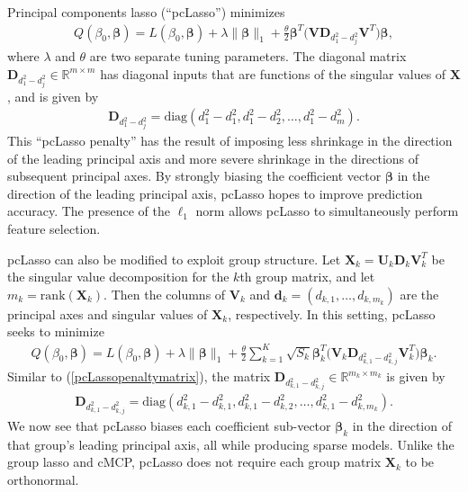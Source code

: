 \documentclass[11pt]{article}
\begin{document}
Principal components lasso (``pcLasso'') \cite{2018arXiv181004651T} minimizes 
\begin{align}
    \label{pcLasso}
    Q(\beta_0, \bm{\beta}) = L(\beta_0, \bm{\beta}) + \lambda \| \bm{\beta} \|_1 + \frac{\theta}{2} \bm{\beta}^T \Big( \mathbf{V} \mathbf{D}_{d_1^2 - d_j^2} \mathbf{V}^T \Big) \bm{\beta},
\end{align}
where $\lambda$ and $\theta$ are two separate tuning parameters. The diagonal matrix $\mathbf{D}_{d_1^2 - d_j^2} \in \mathbb{R}^{m \times m}$ has diagonal inputs that are functions of the singular values of $\mathbf{X}$, and is given by 
\begin{align}
    \label{pcLassopenaltymatrix}
    \mathbf{D}_{d_1^2 - d_j^2} = \mathrm{diag}(d_1^2 - d_1^2, d_1^2 - d_2^2, \ldots, d_1^2 - d_m^2).
\end{align}
This ``pcLasso penalty'' has the result of imposing less shrinkage in the direction of the leading principal axis and more severe shrinkage in the directions of subsequent principal axes. By strongly biasing the coefficient vector $\bm{\beta}$ in the direction of the leading principal axis, pcLasso hopes to improve prediction accuracy. The presence of the $\ell_1$ norm allows pcLasso to simultaneously perform feature selection. 

pcLasso can also be modified to exploit group structure. Let $\mathbf{X}_k = \mathbf{U}_k \mathbf{D}_k \mathbf{V}_k^T$ be the singular value decomposition for the $k$th group matrix, and let $m_k = \mathrm{rank}(\mathbf{X}_k)$. Then the columns of $\mathbf{V}_k$ and $\bm{d}_k = (d_{k,1}, \ldots, d_{k, m_k})$ are the principal axes and singular values of $\mathbf{X}_k$, respectively. In this setting, pcLasso seeks to minimize
\begin{align}
    \label{pcLassogroup}
    Q(\beta_0, \bm{\beta}) = L(\beta_0, \bm{\beta}) + \lambda \| \bm{\beta} \|_1 + \frac{\theta}{2} \sum_{k=1}^K \sqrt{S_k} \bm{\beta}_k^T \Big( \mathbf{V}_k \mathbf{D}_{d_{k,1}^2 - d_{k,j}^2} \mathbf{V}_k^T \Big) \bm{\beta}_k.
\end{align}
Similar to (\ref{pcLassopenaltymatrix}), the matrix $\mathbf{D}_{d_{k,1}^2 - d_{k,j}^2} \in \mathbb{R}^{m_k \times m_k}$ is given by 
\begin{align}
    \label{pcLassopenaltymatrixgroup}
    \mathbf{D}_{d_{k,1}^2 - d_{k,j}^2} = \mathrm{diag}(d_{k,1}^2 - d_{k,1}^2, d_{k,1}^2 - d_{k,2}^2, \ldots, d_{k,1}^2 - d_{k,m_k}^2).
\end{align}
We now see that pcLasso biases each coefficient sub-vector $\bm{\beta}_k$ in the direction of that group's leading principal axis, all while producing sparse models. Unlike the group lasso and cMCP, pcLasso does not require each group matrix $\mathbf{X}_k$ to be orthonormal. 
\end{document}

